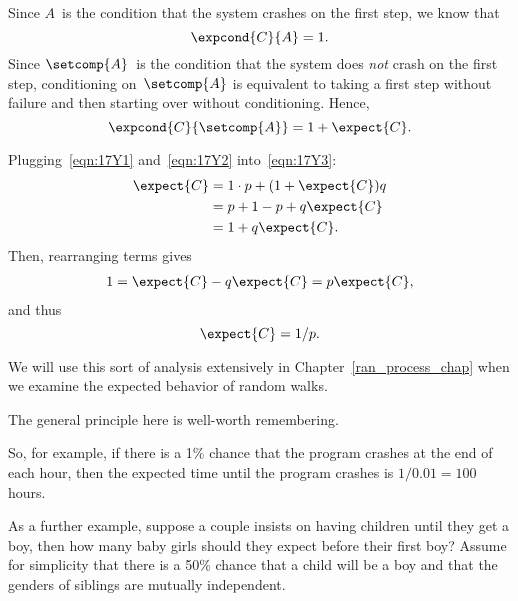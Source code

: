 Since $A$~is the condition that the system crashes on the first
step, we know that
\begin{equation}\label{eqn:17Y1}
    \expcond{C}{A} = 1.
\end{equation}
Since $\setcomp{A}$~is the condition that the system does \emph{not} crash on
the first step, conditioning on~$\setcomp{A}$ is equivalent to taking a first
step without failure and then starting over without conditioning.
Hence,
\begin{equation}\label{eqn:17Y2}
    \expcond{C}{\setcomp{A}} = 1 + \expect{C}.
\end{equation}

Plugging~\eqref{eqn:17Y1} and~\eqref{eqn:17Y2} into~\eqref{eqn:17Y3}:
\begin{align*}
\expect{C}
    &= 1 \cdot p + (1 + \expect{C}) q \\
    &= p + 1 - p + q \expect{C} \\
    &= 1 + q \expect{C}.
\end{align*}
Then, rearranging terms gives
\begin{align*}
    1   = \expect{C} - q \expect{C} %
        = p \expect{C},
\end{align*}
and thus 
\[
\expect{C} = 1/p.
\]

\begin{editingnotes}
We will use this sort of analysis extensively in
Chapter~\ref{ran_process_chap} when we examine the expected behavior
of random walks.
\end{editingnotes}

The general principle here is well-worth remembering.


So, for example, if there is a 1\% chance that the program crashes at
the end of each hour, then the expected time until the program crashes
is $1 / 0.01 = 100$ hours.  

As a further example, suppose a couple insists on having children
until they get a boy, then how many baby girls should they expect
before their first boy?  Assume for simplicity that there is a 50\%
chance that a child will be a boy and that the genders of siblings
are mutually independent.

